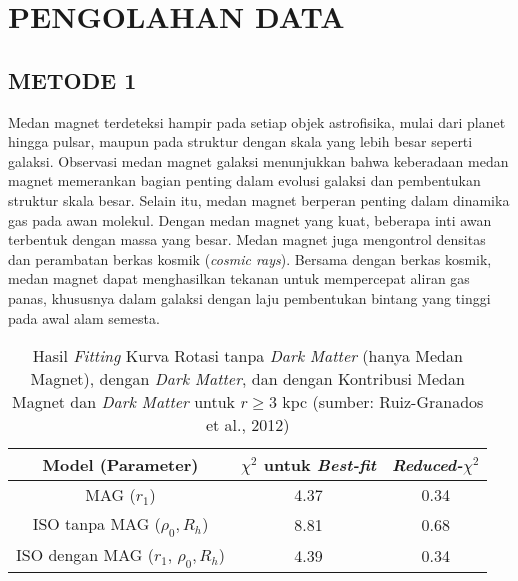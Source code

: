 \chapter{PENGOLAHAN DATA}
\vspace{1.0cm}

\section{METODE 1}
	Medan magnet terdeteksi hampir pada setiap objek astrofisika, mulai dari planet hingga pulsar, maupun pada struktur dengan skala yang lebih besar seperti  galaksi. Observasi medan magnet galaksi menunjukkan bahwa keberadaan medan magnet memerankan bagian penting dalam evolusi galaksi dan pembentukan struktur skala besar. Selain itu, medan magnet berperan penting dalam dinamika gas pada awan molekul. Dengan medan magnet yang kuat, beberapa inti awan terbentuk dengan massa yang besar. Medan magnet juga mengontrol densitas dan perambatan berkas kosmik (\textit{cosmic rays}). Bersama dengan berkas kosmik, medan magnet dapat menghasilkan tekanan untuk mempercepat aliran gas panas, khususnya dalam galaksi dengan laju pembentukan bintang yang tinggi pada awal alam semesta. \\
	

\begin{table}[H] 
\begin{center}
\caption[Hasil \textit{Fitting} Kurva Rotasi M31 dengan dan tanpa Medan Magnet]{Hasil \textit{Fitting} Kurva Rotasi tanpa \textit{Dark Matter} (hanya Medan Magnet), dengan \textit{Dark Matter}, dan dengan Kontribusi Medan Magnet dan \textit{Dark Matter} untuk $r\geq 3$ kpc (sumber: Ruiz-Granados et al., 2012)}
\begin{tabular}{ccc}
\hline
Model (Parameter) & $\chi^{2}$ untuk \textit{Best-fit} & \textit{Reduced-}$\chi^{2}$ \\
\hline
MAG ($r_{1}$) & 4.37 & 0.34 \\
ISO tanpa MAG ($\rho_{0}, R_{h}$) & 8.81 & 0.68 \\
ISO dengan MAG ($r_{1}$, $\rho_{0}, R_{h}$) & 4.39 & 0.34 \\
\hline
\end{tabular}
\label{table:fitting}
\end{center}
\end{table} 